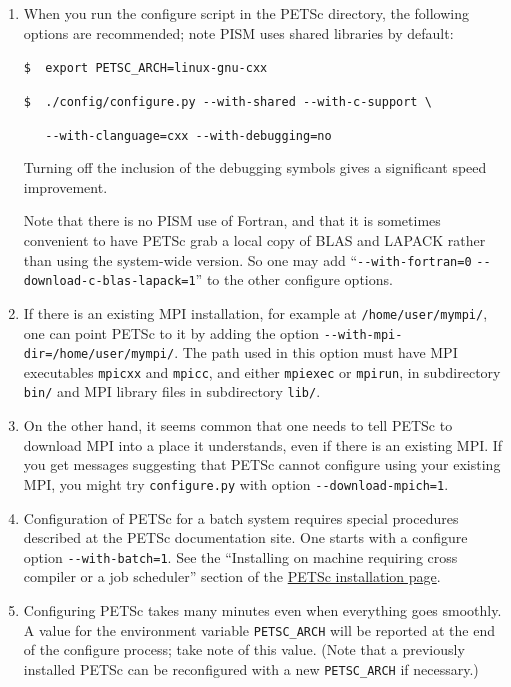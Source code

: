 \documentclass[11pt,final]{amsart}
\begin{document}
\begin{enumerate}
\begin{enumerate}
\item When you run the configure script in the PETSc directory, the following options are recommended; note PISM uses shared libraries by default:

\verb|$  export PETSC_ARCH=linux-gnu-cxx|

\verb|$  ./config/configure.py --with-shared --with-c-support \|

\verb|   --with-clanguage=cxx --with-debugging=no|

Turning off the inclusion of the debugging symbols gives a significant speed improvement.

Note that there is no PISM use of Fortran, and that it is sometimes convenient to have PETSc grab a local copy of BLAS and LAPACK rather than using the system-wide version.  So one may add ``\verb|--with-fortran=0| \verb|--download-c-blas-lapack=1|'' to the other configure options.

\item If there is an existing MPI installation, for example at \verb|/home/user/mympi/|, one can point PETSc to it by adding the option \verb|--with-mpi-dir=/home/user/mympi/|.  The path used in this option must have MPI executables \verb|mpicxx| and \verb|mpicc|, and either \verb|mpiexec| or \verb|mpirun|, in subdirectory \verb|bin/| and MPI library files in subdirectory \verb|lib/|.

\item On the other hand, it seems common that one needs to tell PETSc to download MPI into a place it understands, even if there is an existing MPI.  If you get messages suggesting that PETSc cannot configure using your existing MPI, you might try \verb|configure.py| with option \verb|--download-mpich=1|.

\item Configuration of PETSc for a batch system requires special procedures described at the PETSc documentation site.  One starts with a configure option \verb|--with-batch=1|.  See the ``Installing on machine requiring cross compiler or a job scheduler'' section of the \href{http://www-unix.mcs.anl.gov/petsc/petsc-2/documentation/installation.html}{PETSc installation page}.

\item  Configuring PETSc takes many minutes even when everything goes smoothly.   A value for the environment variable \verb|PETSC_ARCH| will be reported at the end of the configure process; take note of this value.  (Note that a previously installed PETSc can be reconfigured with a new \verb|PETSC_ARCH| if necessary.)


\end{enumerate}
\end{enumerate}
\end{document}
